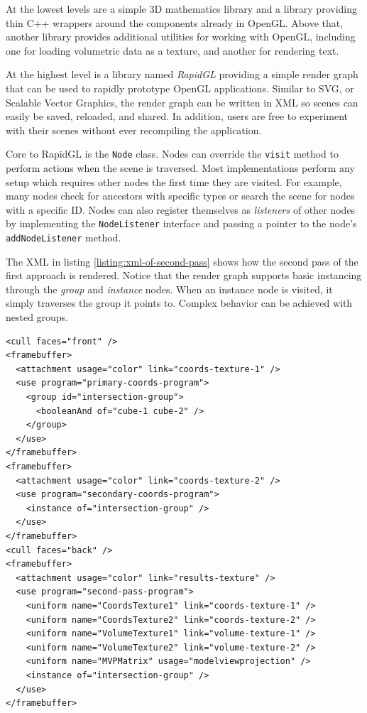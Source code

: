 \documentclass{report}
\begin{document}
At the lowest levels are a simple 3D mathematics library and a library providing
thin C++ wrappers around the components already in OpenGL.  Above that, another
library provides additional utilities for working with OpenGL, including one for
loading volumetric data as a texture, and another for rendering text.

At the highest level is a library named {\em RapidGL} providing a simple render
graph that can be used to rapidly prototype OpenGL applications.  Similar to
SVG, or Scalable Vector Graphics, the render graph can be written in XML so
scenes can easily be saved, reloaded, and shared.  In addition, users are free
to experiment with their scenes without ever recompiling the application.

Core to RapidGL is the {\tt Node} class.  Nodes can override the {\tt visit}
method to perform actions when the scene is traversed.  Most implementations
perform any setup which requires other nodes the first time they are visited.
For example, many nodes check for ancestors with specific types or search the
scene for nodes with a specific ID.  Nodes can also register themselves as {\em
listeners} of other nodes by implementing the {\tt NodeListener} interface and
passing a pointer to the node's {\tt addNodeListener} method.

The XML in listing \ref{listing:xml-of-second-pass} shows how the second pass of
the first approach is rendered.  Notice that the render graph supports basic
instancing through the {\em group} and {\em instance} nodes.  When an instance
node is visited, it simply traverses the group it points to.  Complex behavior
can be achieved with nested groups.

\lstset{language=XML}
\lstset{markfirstintag=true}
\lstset{showstringspaces=false}
\lstset{caption=XML of second pass for first approach.}
\lstset{captionpos=b}
\lstset{label=listing:xml-of-second-pass}
\begin{lstlisting}[frame=single,float]
<cull faces="front" />
<framebuffer>
  <attachment usage="color" link="coords-texture-1" />
  <use program="primary-coords-program">
    <group id="intersection-group">
      <booleanAnd of="cube-1 cube-2" />
    </group>
  </use>
</framebuffer>
<framebuffer>
  <attachment usage="color" link="coords-texture-2" />
  <use program="secondary-coords-program">
    <instance of="intersection-group" />
  </use>
</framebuffer>
<cull faces="back" />
<framebuffer>
  <attachment usage="color" link="results-texture" />
  <use program="second-pass-program">
    <uniform name="CoordsTexture1" link="coords-texture-1" />
    <uniform name="CoordsTexture2" link="coords-texture-2" />
    <uniform name="VolumeTexture1" link="volume-texture-1" />
    <uniform name="VolumeTexture2" link="volume-texture-2" />
    <uniform name="MVPMatrix" usage="modelviewprojection" />
    <instance of="intersection-group" />
  </use>
</framebuffer>
\end{lstlisting}
\end{document}
